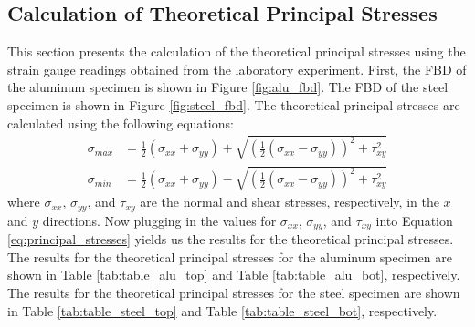 \documentclass[12pt, titlepage]{article}
\begin{document}
\subsection{Calculation of Theoretical Principal Stresses}
This section presents the calculation of the theoretical principal stresses
using the strain gauge readings obtained from the laboratory experiment. First,
the FBD of the aluminum specimen is shown in Figure \ref{fig:alu_fbd}. The FBD
of the steel specimen is shown in Figure \ref{fig:steel_fbd}. The theoretical principal stresses are calculated using the following equations:
\begin{equation}
    \begin{split}
      \sigma_{max} &= \frac{1}{2} \left( \sigma_{xx} + \sigma_{yy} \right) + \sqrt{\left( \frac{1}{2} \left( \sigma_{xx} - \sigma_{yy} \right) \right)^2 + \tau_{xy}^2} \\[10pt]
      \sigma_{min} &= \frac{1}{2} \left( \sigma_{xx} + \sigma_{yy} \right) - \sqrt{\left( \frac{1}{2} \left( \sigma_{xx} - \sigma_{yy} \right) \right)^2 + \tau_{xy}^2}
      \label{eq:principal_stresses}
    \end{split}
  \end{equation}
where $\sigma_{xx}$, $\sigma_{yy}$, and $\tau_{xy}$ are the normal and shear
stresses, respectively, in the $x$ and $y$ directions. Now plugging in the
values for $\sigma_{xx}$, $\sigma_{yy}$, and $\tau_{xy}$ into Equation
\ref{eq:principal_stresses} yields us the results for the theoretical
principal stresses. The results for the theoretical principal stresses for the
aluminum specimen are shown in Table \ref{tab:table_alu_top} and Table
\ref{tab:table_alu_bot}, respectively. The results for the theoretical
principal stresses for the steel specimen are shown in Table
\ref{tab:table_steel_top} and Table \ref{tab:table_steel_bot}, respectively.
\end{document}
